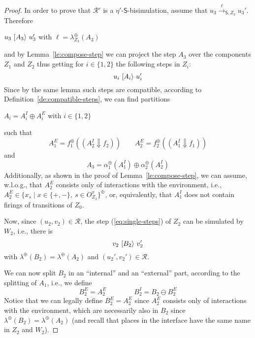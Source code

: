 \documentclass{LMCS}
\newcommand{\mon}[1]{\ensuremath{{#1}^\oplus}}
\newcommand{\monSub}[2]{\ensuremath{{#1}_{#2}^\oplus}}
\newcommand{\sres}[2]{\ensuremath{({#1}\!\Downarrow\!{#2})}}
\newcommand{\trans}[1]{\ensuremath{\ [\/{#1}\/\rangle}\ }
\newcommand{\ltr}[3][x]{\ensuremath{\stackrel{{#3}}{\longrightarrow}_{\mathsf{#1},#2}}}
\begin{document}
\begin{proof}
  In order to prove that $\mathcal{R}'$ is a
  $\eta'$-$\mathsf{S}$-bisimulation, assume that $u_3
  \ltr[S]{Z_3}{\ell} u_3'$.
Therefore
  \begin{center}
    $u_3 \trans{A_3} u_3'$ \quad with $\ell = \monSub{\lambda}{Z_3}(A_3)$
  \end{center}
  and by Lemma~\ref{le:compose-step} we can project the step $A_3$ over
  the components $Z_1$ and $Z_2$ thus getting for $i \in \{ 1, 2\}$
  the following steps in $Z_i$:
  \begin{equation}
    \label{eq:single-steps}
    u_i \trans{A_i} u_i'   
  \end{equation}
  Since by the same lemma such steps are compatible, according to
  Definition~\ref{de:compatible-steps}, we can find partitions
  \begin{center}
    $A_i = A_i^I \oplus A_i^E$ with  $i \in \{ 1, 2\}$
  \end{center}
  such that
  \begin{equation}
    \label{eq:compat}
    A_1^E = \monSub{f}{1}(\sres{A_2^I}{f_2}) \qquad     
    A_2^E = \monSub{f}{2}(\sres{A_1^I}{f_1})
  \end{equation}
  and 
  \begin{equation}
    \label{eq:A3}
    A_3 = \monSub{\alpha}{1}(A_1^I) \oplus \monSub{\alpha}{2}(A_2^I)
  \end{equation}
  Additionally, as shown in the proof of Lemma~\ref{le:compose-step},
  we can assume, w.l.o.g., that $A_2^E$ consists only of interactions
  with the environment, i.e., $A_2^E \in \mon{\{x_s \mid x \in \{ +,
    -\},\ s \in O_{Z_2}^x\}}$, or, equivalently, that $A_1^I$ does not
  contain firings of transitions of $Z_0$.

  \medskip

  Now, since $(u_2,v_2) \in \mathcal{R}$, the step
  (\ref{eq:single-steps}) of $Z_2$ can be simulated by $W_2$, i.e.,
  there is
  \begin{equation}
    \label{eq:trans2}
    v_2 \trans{B_2} v_2'
  \end{equation}
  with $\mon{\lambda}(B_2) = \mon{\lambda}(A_2)$ and $(u_2', v_2') \in
  \mathcal{R}$.

  \bigskip

  We can now split $B_2$ in an ``internal'' and an ``external'' part,
  according to the splitting of $A_1$, i.e., we define
  \begin{equation}
    \label{eq:B2E}
    B_2^E = A_2^E \qquad \qquad B_2^I = B_2 \ominus B_2^E
  \end{equation}
  Notice that we can legally define $B_2^E = A_2^E$ since $A_2^E$
  consists only of interactions with the environment, which are
  necessarily also in $B_2$ since $\mon{\lambda}(B_2) =
  \mon{\lambda}(A_2)$ (and recall that places in the interface have
  the same name in $Z_2$ and $W_2$).


\end{proof}
\end{document}
